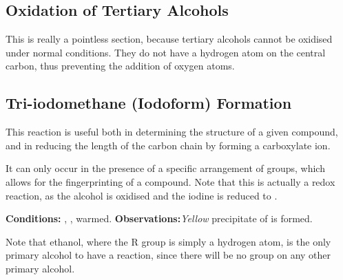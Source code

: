 

		\subsection{Oxidation of Tertiary Alcohols}

			This is really a pointless section, because tertiary alcohols cannot be oxidised under normal conditions. They do not have a hydrogen
			atom on the central carbon, thus preventing the addition of oxygen atoms.


		\pagebreak
		\subsection{Tri-iodomethane (Iodoform) Formation}

			This reaction is useful both in determining the structure of a given compound, and in reducing the length of the carbon chain by
			forming a carboxylate ion.

			It can only occur in the presence of a specific arrangement of groups, which allows for the fingerprinting of a compound. Note that
			this is actually a redox reaction, as the alcohol is oxidised and the iodine is reduced to .


			\vspace{1.5em}
			\vbox{\textbf{Conditions:}	\tabto{35mm}, , warmed.}
			\vbox{\textbf{Observations:}\tabto{35mm}\textit{\color{Dandelion}Yellow} precipitate of  is formed.}


			Note that ethanol, where the R group is simply a hydrogen atom, is the only primary alcohol to have a reaction, since there will
			be no  group on any other primary alcohol.






















